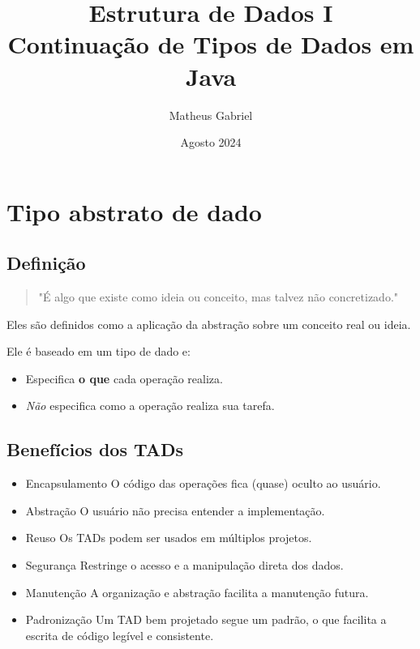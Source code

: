 \documentclass{article}
\title{Estrutura de Dados I
\\ \large Continuação de Tipos de Dados em Java}
\author{Matheus Gabriel}
\date{Agosto 2024}
\begin{document}
\maketitle

\section{Tipo abstrato de dado}

\subsection{Definição}

\begin{quote}
    "É algo que existe como ideia ou conceito, mas talvez não concretizado."
\end{quote} 

Eles são definidos como a aplicação da abstração sobre um conceito real ou ideia.

\begin{tcolorbox}[title=Importante, colback=yellow!10!white, colframe=orange!75!black]
Ele é baseado em um tipo de dado e:

\begin{itemize}
    \item Especifica \textbf{o que} cada operação realiza.
    \item \textit{Não} especifica como a operação realiza sua tarefa.
\end{itemize}

\end{tcolorbox}

\subsection{Benefícios dos TADs}

\begin{itemize}
    \item Encapsulamento
    \subitem O código das operações fica (quase) oculto ao usuário.
    \item Abstração
    \subitem O usuário não precisa entender a implementação.
    \item Reuso
    \subitem Os TADs podem ser usados em  múltiplos projetos.
    \item Segurança
    \subitem Restringe o acesso e a manipulação direta dos dados.
    \item Manutenção
    \subitem A organização e abstração facilita a manutenção futura.
    \item Padronização
    \subitem Um TAD bem projetado segue um padrão, o que facilita a escrita de código legível e consistente.
\end{itemize}
\end{document}
